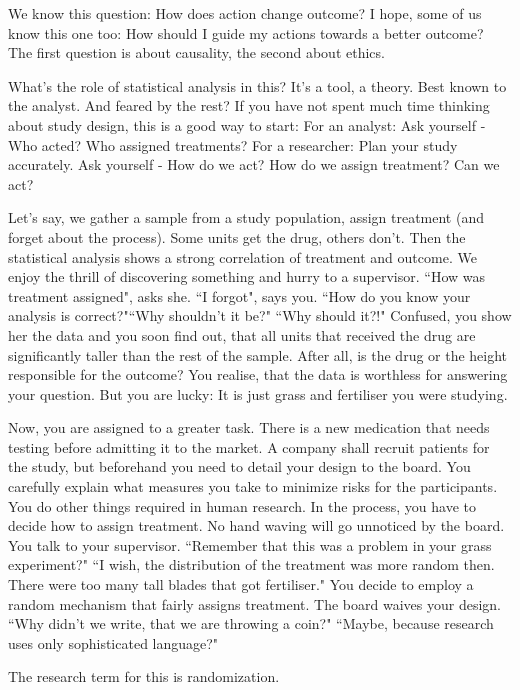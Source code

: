 We know this question:
How does action change outcome?
I hope, some of us know this one too: 
How should I guide my actions towards a better outcome?
The first question is about causality, the second about ethics.

What's the role of statistical analysis in this?
It's a tool, a theory. Best known to the analyst. And feared by the rest?
If you have not spent much time thinking about study design, this is a good way to start: 
For an analyst: Ask yourself - Who acted? Who assigned treatments?
For a researcher: Plan your study accurately. Ask yourself - How do we act? How do we assign treatment? Can we act?

Let's say, we gather a sample from a study population, assign treatment (and forget about the process). Some units get the drug, others don't. Then the statistical analysis shows a strong correlation of treatment and outcome. We enjoy the thrill of discovering something and hurry to a supervisor. “How was treatment assigned", asks she. “I forgot", says you.
“How do you know your analysis is correct?"“Why shouldn't it be?"
“Why should it?!"
Confused, you show her the data and you soon find out, that all units that received the drug are significantly taller than the rest of the sample.
After all, is the drug or the height responsible for the outcome?
You realise, that the data is worthless for answering your question.
But you are lucky: It is just grass and fertiliser you were studying.

Now, you are assigned to a greater task. There is a new medication that needs testing before admitting it to the market. 
A company shall recruit patients for the study, but beforehand you need to detail your design to the board. You carefully explain what measures you take to minimize risks for the participants.
You do other things required in human research.
In the process, you have to decide how to assign treatment.
No hand waving will go unnoticed by the board. You talk to your supervisor.
“Remember that this was a problem in your grass experiment?"
“I wish, the distribution of the treatment was more random then. There were too many tall blades that got fertiliser."
You decide to employ a random mechanism that fairly assigns treatment. The board waives your design. “Why didn't we write, that we are throwing a coin?" “Maybe, because research uses only sophisticated language?"

The research term for this is randomization.



